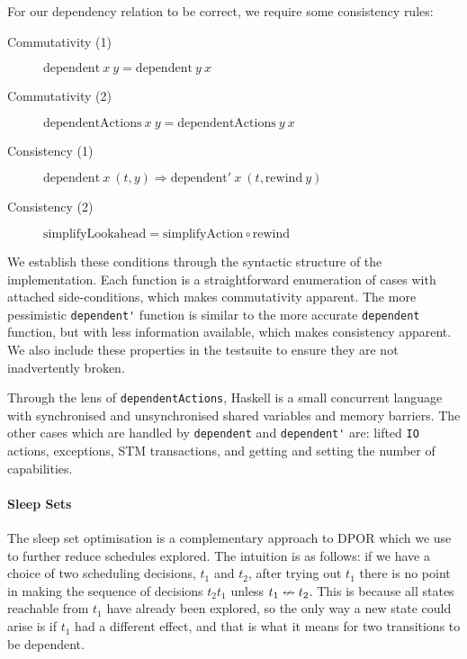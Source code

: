 For our dependency relation to be correct, we require some consistency
rules:

\begin{description}
\item[Commutativity (1)]
  $\mathrm{dependent}~x~y = \mathrm{dependent}~y~x$
\item[Commutativity (2)]
  $\mathrm{dependentActions}~x~y = \mathrm{dependentActions}~y~x$
\item[Consistency (1)]
  $\mathrm{dependent}~x~(t,y) \Rightarrow \mathrm{dependent'}~x~(t, \mathrm{rewind}~y)$
\item[Consistency (2)]
  $\mathrm{simplifyLookahead} = \mathrm{simplifyAction} \circ \mathrm{rewind}$
\end{description}

We establish these conditions through the syntactic structure of the
implementation.  Each function is a straightforward enumeration of
cases with attached side-conditions, which makes commutativity
apparent.  The more pessimistic \verb|dependent'| function is similar
to the more accurate \verb|dependent| function, but with less
information available, which makes consistency apparent.  We also
include these properties in the \dejafu{} testsuite to ensure they are
not inadvertently broken.

Through the lens of \verb|dependentActions|, Haskell is a small
concurrent language with synchronised and unsynchronised shared
variables and memory barriers.  The other cases which are handled by
\verb|dependent| and \verb|dependent'| are: lifted \verb|IO| actions,
exceptions, STM transactions, and getting and setting the number of
capabilities.

\paragraph{Sleep Sets}
The sleep set optimisation is a complementary approach to
DPOR\cite{flanagan2005,godefroid1996} which we use to further reduce
schedules explored.  The intuition is as follows: if we have a choice
of two scheduling decisions, $t_{1}$ and $t_{2}$, after trying out
$t_{1}$ there is no point in making the sequence of decisions
$t_{2}t_{1}$ unless $t_{1} \nleftrightarrow t_{2}$.  This is because all
states reachable from $t_{1}$ have already been explored, so the only
way a new state could arise is if $t_{1}$ had a different effect, and
that is what it means for two transitions to be dependent.

